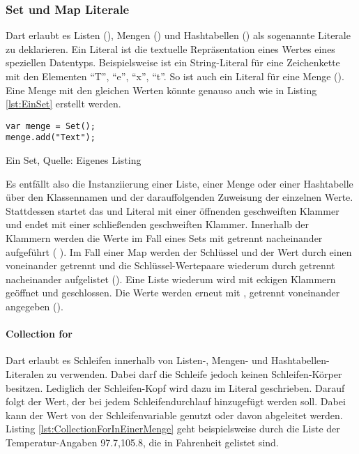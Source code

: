\subsubsection{Set und Map Literale}

Dart erlaubt es Listen (), Mengen () und Hashtabellen () als sogenannte Literale zu deklarieren.
Ein Literal ist die textuelle Repräsentation eines Wertes eines speziellen Datentyps.
Beispielsweise ist   ein String-Literal für eine Zeichenkette mit den Elementen \enquote{T}, \enquote{e}, \enquote{x}, \enquote{t}.
So ist auch   ein Literal für eine Menge ().
Eine Menge mit den gleichen Werten könnte genauso auch wie in Listing \ref{lst:EinSet} erstellt werden.

\ifincludeall
  \begin{listing}[ht]
    \begin{verbatim}
var menge = Set();
menge.add("Text");
\end{verbatim}
    \caption[Ein Set]{Ein Set, Quelle: Eigenes Listing}
    \label{lst:EinSet}
  \end{listing}
\fi

Es entfällt also die Instanziierung einer Liste, einer Menge oder einer Hashtabelle über den Klassennamen und der darauffolgenden Zuweisung der einzelnen Werte.
Stattdessen startet das  und  Literal mit einer öffnenden geschweiften Klammer und endet mit einer schließenden geschweiften Klammer.
Innerhalb der Klammern werden die Werte im Fall eines Sets mit \IC{,} getrennt nacheinander aufgeführt (  ).
Im Fall einer Map werden der Schlüssel und der Wert durch einen \IC{:} voneinander getrennt und die Schlüssel-Wertepaare wiederum durch \IC{,} getrennt nacheinander aufgelistet ().
Eine Liste wiederum wird mit eckigen Klammern geöffnet und geschlossen.
Die Werte werden erneut mit , getrennt voneinander angegeben (\IC{[1,2]}).

\paragraph{Collection for} Dart erlaubt es Schleifen innerhalb von Listen-, Mengen- und Hashtabellen-Literalen zu verwenden.
Dabei darf die Schleife jedoch keinen Schleifen-Körper besitzen.
Lediglich der Schleifen-Kopf wird dazu im Literal geschrieben.
Darauf folgt der Wert, der bei jedem Schleifendurchlauf hinzugefügt werden soll.
Dabei kann der Wert von der Schleifenvariable genutzt oder davon abgeleitet werden.
Listing \ref{lst:CollectionForInEinerMenge} geht beispielsweise durch die Liste der Temperatur-Angaben 97.7,105.8, die in Fahrenheit gelistet sind.

